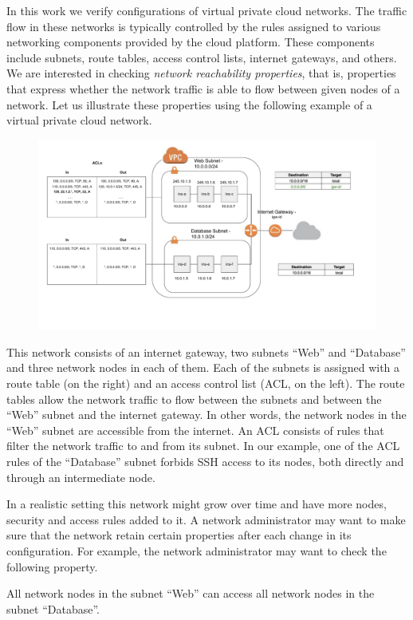 %
%
In this work we verify configurations of virtual private cloud networks. The traffic flow in these networks is typically controlled by the rules assigned to various networking components provided by the cloud platform. These components include subnets, route tables, access control lists, internet gateways, and others. We are interested in checking \emph{network reachability properties}, that is, properties that express whether the network traffic is able to flow between given nodes of a network. Let us illustrate these properties using the following example of a virtual private cloud network. 
\begin{figure}[th]
\centering\includegraphics[width=1.0\textwidth]{./aws/fig/vpc.pdf}
\end{figure}

This network consists of an internet gateway, two subnets ``Web'' and ``Database'' and three network nodes in each of them. Each of the subnets is assigned with a route table (on the right) and an access control list (ACL, on the left). The route tables allow the network traffic to flow between the subnets and between the ``Web'' subnet and the internet gateway. In other words, the network nodes in the ``Web'' subnet are accessible from the internet. An ACL consists of rules that filter the network traffic to and from its subnet. In our example, one of the ACL rules of the ``Database'' subnet forbids SSH access to its nodes, both directly and through an intermediate node.

In a realistic setting this network might grow over time and have more nodes, security and access rules added to it. A network administrator may want to make sure that the network retain certain properties after each change in its configuration. For example, the network administrator may want to check the following property.
\begin{example}\label{prop:bool-property}
All network nodes in the subnet ``Web'' can access all network nodes in the subnet ``Database''.
\end{example}

